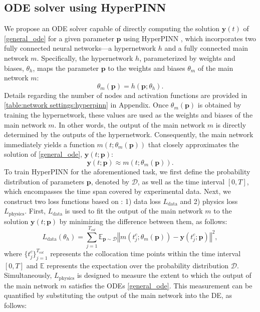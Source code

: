 \documentclass[letterpaper]{article} %
\theoremstyle{thmstyleone}%
\theoremstyle{thmstyletwo}%
\theoremstyle{thmstylethree}%
\begin{document}
\subsection{ODE solver using HyperPINN}
We propose an ODE solver capable of directly computing the solution $\mathbf{y}(t)$ of \cref{general_ode} for a given parameter $\mathbf{p}$ using HyperPINN \cite{de2021hyperpinn}, which incorporates two fully connected neural networks---a hypernetwork $h$ \cite{ha2016hypernetworks, galanti2020modularity, lee2023hyperdeeponet} and a fully connected main network $m$. Specifically, the hypernetwork $h$, parameterized by weights and biases, $\theta_{h}$, maps the parameter $\mathbf{p}$ to the weights and biases $\theta_{m}$ of the main network $m$: 
\begin{equation} \label{equation:hypernetwork} \theta_{m}(\mathbf{p})=h(\mathbf{p};\theta_h).
\end{equation} 
Details regarding the number of nodes and activation functions are provided in \cref{table:network settings:hyperpinn} in Appendix. Once $\theta_{m}(\mathbf{p})$ is obtained by training the hypernetwork, these values are used as the weights and biases of the main network $m$. In other words, the output of the main network $m$ is directly determined by the outputs of the hypernetwork. Consequently, the main network immediately yields a function $m(t;\theta_m(\mathbf{p}))$ that closely approximates the solution of \cref{general_ode}, $\mathbf{y}(t;\mathbf{p})$:
\begin{equation}\label{equation:mainnetwork}
\mathbf{y}(t;\mathbf{p}) \approx m(t;\theta_m(\mathbf{p})).
\end{equation}
To train HyperPINN for the aforementioned task, we first define the probability distribution of parameters $\mathbf{p}$, denoted by $\mathcal{D}$, as well as the time interval $[0, T]$, which encompasses the time span covered by experimental data. Next, we construct two loss functions based on \citep{de2021hyperpinn}: 1) data loss $L_{\text{data}}$ and 2) physics loss $L_{\text{physics}}$. First, $L_{\text{data}}$ is used to fit the output of the main network $m$ to the solution $\mathbf{y}(t;\mathbf{p})$ by minimizing the difference between them, as follows:
\begin{equation}\label{equation:loss_data}
L_{\text{data}}(\theta_h) = \sum_{j=1}^{T_{col}} \mathbb{E}_{\mathbf{p}\sim\mathcal{D}} \left\Vert m(t^c_{j}; \theta_m(\mathbf{p})) - \mathbf{y}(t^c_{j};\mathbf{p})\right\Vert^2,
\end{equation}
where $\{t_j^{c}\}_{j=1}^{T_{col}}$ represents the collocation time points within the time interval $[0,T]$ and $\mathbb{E}$ represents the expectation over the probability distribution $\mathcal{D}$. Simultaneously, $L_{\text{physics}}$ is designed to measure the extent to which the output of the main network $m$ satisfies the ODEs \cref{general_ode}. This measurement can be quantified by substituting the output of the main network into the DE, as follows:
\end{document}
